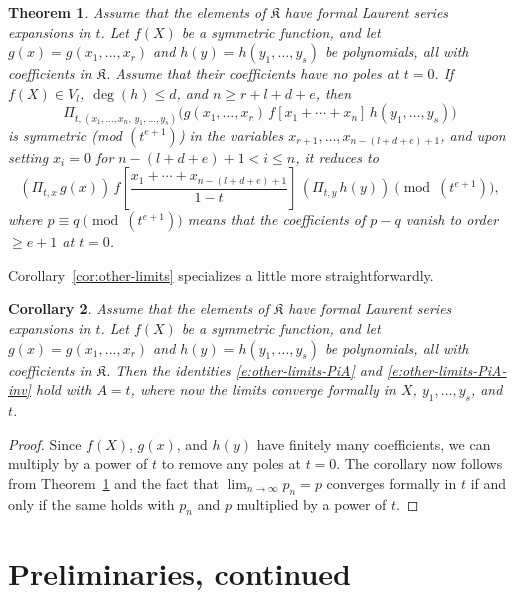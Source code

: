 \documentclass[12pt]{amsart}
\newtheorem{thm}{Theorem}[subsection]
\newtheorem{cor}[thm]{Corollary}
\theoremstyle{definition}
\theoremstyle{remark}
\newcommand{\Kfrak}{{\mathfrak K}}
\begin{document}
\begin{thm}\label{thm:Pit-symm}
Assume that the elements of $\Kfrak $ have formal Laurent series
expansions in $t$.  Let $f(X)$ be a symmetric function, and let $g(x)
= g(x_{1},\ldots,x_{r})$ and $h(y) = h(y_{1},\ldots,y_{s})$ be
polynomials, all with coefficients in $\Kfrak $.  Assume that their
coefficients have no poles at $t=0$.  If $f(X)\in V_{l}$, $\deg
(h)\leq d$, and $n\geq r+l+d+e$, then
\begin{equation}\label{e:Pit-symm-in}
\Pi _{t,(x_{1}, \ldots, x_{n},\, y_{1},\ldots,y_{s})}
\bigl(g(x_{1},\ldots,x_{r})\, f[x_{1}+\cdots +x_{n}] \,
h(y_{1},\ldots,y_{s})\bigr)
\end{equation}
is symmetric {\rm (mod $(t^{e+1})$)} in the variables
$x_{r+1},\ldots,x_{n-(l+d+e)+1}$, and upon setting $x_{i} = 0$ for
$n-(l+d+e)+1<i\leq n$, it reduces to
\begin{equation}\label{e:Pit-symm-out}
(\Pi _{t,x}\, g(x))\, f \! \left[\frac{x_{1}+\cdots
+x_{n-(l+d+e)+1}}{1-t} \right]\, (\Pi _{t,y}\, h(y)) \pmod{
(t^{e+1})},
\end{equation}
where $p\equiv q \pmod{(t^{e+1})}$ means that the coefficients of
$p-q$ vanish to order $\geq e+1$ at $t=0$.
\end{thm}

Corollary~\ref{cor:other-limits} specializes a little more
straightforwardly.

\begin{cor}\label{cor:other-limits2}
Assume that the elements of $\Kfrak $ have formal Laurent series
expansions in $t$.  Let $f(X)$ be a symmetric function, and let $g(x)
= g(x_{1},\ldots,x_{r})$ and $h(y) = h(y_{1},\ldots,y_{s})$ be
polynomials, all with coefficients in $\Kfrak $.  Then the identities
\eqref{e:other-limits-PiA} and \eqref{e:other-limits-PiA-inv} hold
with $A = t$, where now the limits converge formally in $X$,
$y_{1},\ldots,y_{s}$, and $t$.
\end{cor}

\begin{proof}
Since $f(X)$, $g(x)$, and $h(y)$ have finitely many coefficients, we
can multiply by a power of $t$ to remove any poles at $t=0$.  The
corollary now follows from Theorem~\ref{thm:Pit-symm} and the fact
that $\lim_{n\rightarrow \infty } p_{n} = p$ converges formally in $t$
if and only if the same holds with $p_{n}$ and $p$ multiplied by a
power of $t$.
\end{proof}


\section{Preliminaries, continued}
\label{s:more-prelim}
\end{document}
